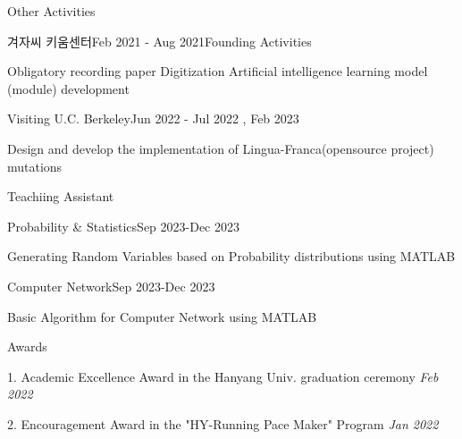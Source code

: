 \documentclass[
	11pt, %
]{resume} %
\begin{document}
	



\begin{rSection}{Other Activities}

	\begin{rSubsection}{겨자씨 키움센터}{Feb 2021 - Aug 2021}{Founding Activities}{}
		\item Obligatory recording paper Digitization Artiﬁcial intelligence learning model (module) development
	\end{rSubsection}

	\begin{rSubsection}{Visiting U.C. Berkeley}{Jun 2022 - Jul 2022 , Feb 2023}{}{}
		\item Design and develop the implementation of Lingua-Franca(opensource project) mutations
	\end{rSubsection}

\end{rSection}

\begin{rSection}{Teachiing Assistant}

	\begin{rSubsection}{Probability \& Statistics}{Sep 2023-Dec 2023}{}{}
		\item Generating Random Variables based on Probability distributions using MATLAB
	\end{rSubsection}

	\begin{rSubsection}{Computer Network}{Sep 2023-Dec 2023}{}{}
		\item Basic Algorithm for Computer Network using MATLAB
	\end{rSubsection}

\end{rSection}

\begin{rSection}{Awards}

	1. Academic Excellence Award in the Hanyang Univ. graduation ceremony \hfill \textit {Feb 2022}

	2. Encouragement Award in the "HY-Running Pace Maker" Program \hfill \textit {Jan 2022}

\end{rSection}

\end{document}
